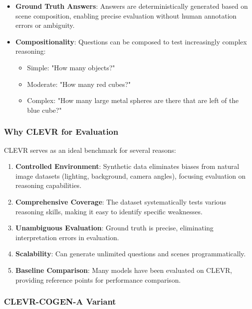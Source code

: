 \documentclass[conference]{IEEEtran}
\begin{document}
\begin{itemize}
    \item \textbf{Ground Truth Answers}: Answers are deterministically generated based on scene composition, enabling precise evaluation without human annotation errors or ambiguity.
    
    \item \textbf{Compositionality}: Questions can be composed to test increasingly complex reasoning:
    \begin{itemize}
        \item Simple: "How many objects?"
        \item Moderate: "How many red cubes?"
        \item Complex: "How many large metal spheres are there that are left of the blue cube?"
    \end{itemize}
\end{itemize}

\subsubsection{Why CLEVR for Evaluation}

CLEVR serves as an ideal benchmark for several reasons:

\begin{enumerate}
    \item \textbf{Controlled Environment}: Synthetic data eliminates biases from natural image datasets (lighting, background, camera angles), focusing evaluation on reasoning capabilities.
    
    \item \textbf{Comprehensive Coverage}: The dataset systematically tests various reasoning skills, making it easy to identify specific weaknesses.
    
    \item \textbf{Unambiguous Evaluation}: Ground truth is precise, eliminating interpretation errors in evaluation.
    
    \item \textbf{Scalability}: Can generate unlimited questions and scenes programmatically.
    
    \item \textbf{Baseline Comparison}: Many models have been evaluated on CLEVR, providing reference points for performance comparison.
\end{enumerate}

\subsubsection{CLEVR-COGEN-A Variant}
\end{document}

